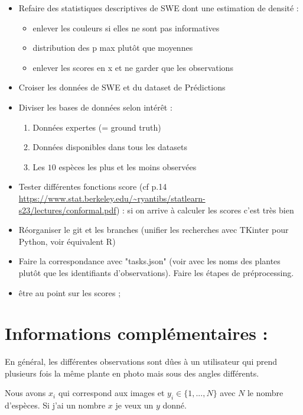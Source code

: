 \documentclass[french]{article}
\begin{document}
\begin{itemize}
    \item Refaire des statistiques descriptives de SWE dont une estimation de densité :
    \begin{itemize}
        \item enlever les couleurs si elles ne sont pas informatives
        \item distribution des p max plutôt que moyennes
        \item enlever les scores en x et ne garder que les observations
    \end{itemize}
    \item Croiser les données de SWE et du dataset de Prédictions
    \item Diviser les bases de données selon intérêt :
    \begin{enumerate}
        \item Données expertes (= ground truth)
        \item Données disponibles dans tous les datasets
        \item Les $10$ espèces les plus et les moins observées
    \end{enumerate}
    \item Tester différentes fonctions score (cf p.14 \url{https://www.stat.berkeley.edu/~ryantibs/statlearn-s23/lectures/conformal.pdf}) : si on arrive à calculer les scores c'est très bien
    \item Réorganiser le git et les branches (unifier les recherches avec TKinter pour Python, voir équivalent R)
    \item  Faire la correspondance avec "tasks.json" (voir avec les noms des plantes plutôt que les identifiants d'observations). Faire les étapes de préprocessing.
    \item être au point sur les scores ; 
\end{itemize}

\section{Informations complémentaires :}

En général, les différentes observations sont dûes à un utilisateur qui prend plusieurs fois la même plante en photo mais sous des angles différents.

\vspace{0.2cm}

Nous avons $x_i$ qui correspond aux images et $y_i \in \{1, ..., N\}$ avec $N$ le nombre d'espèces. Si j'ai un nombre $x$ je veux un $y$ donné.
\end{document}
